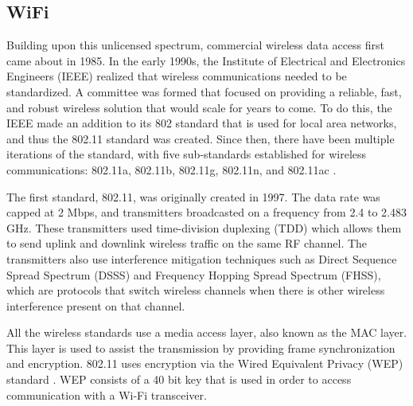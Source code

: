 \subsection{WiFi}
Building upon this unlicensed spectrum, commercial wireless data access first came about in 1985. In the early 1990s, the Institute of Electrical and Electronics Engineers (IEEE) realized that wireless communications needed to be standardized. A committee was formed that focused on providing a reliable, fast, and robust wireless solution that would scale for years to come. To do this, the IEEE made an addition to its 802 standard that is used for local area networks, and thus the 802.11 standard was created. Since then, there have been multiple iterations of the standard, with five sub-standards established for wireless communications: 802.11a, 802.11b, 802.11g, 802.11n, and 802.11ac \cite{bergieee}. \par

The first standard, 802.11, was originally created in 1997. The data rate was capped at 2 Mbps, and transmitters broadcasted on a frequency from 2.4 to 2.483 GHz. These transmitters used time-division duplexing (TDD) which allows them to send uplink and downlink wireless traffic on the same RF channel. The transmitters also use interference mitigation techniques such as Direct Sequence Spread Spectrum (DSSS)\cite{bergieee} and Frequency Hopping Spread Spectrum (FHSS)\cite{bergieee}, which are protocols that switch wireless channels when there is other wireless interference present on that channel.\par

All the wireless standards use a media access layer, also known as the MAC layer\cite{bergieee}. This layer is used to assist the transmission by providing frame synchronization and encryption. 802.11 uses encryption via the Wired Equivalent Privacy (WEP) standard \cite{bergieee}. WEP consists of a 40 bit key that is used in order to access communication with a Wi-Fi transceiver.

